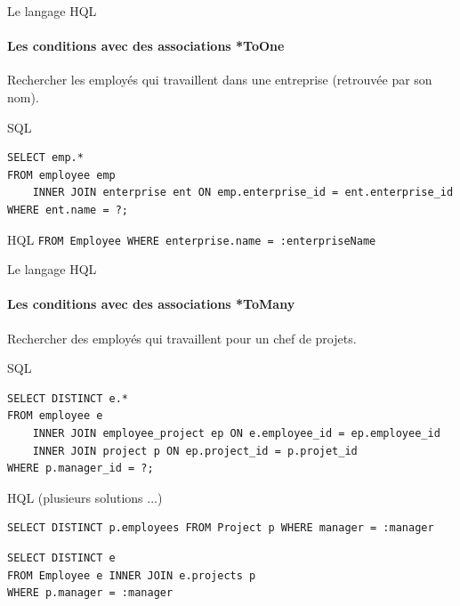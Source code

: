 \documentclass[compact]{beamer}%
\begin{document}
\begin{frame}[fragile]{Le langage HQL}
	\framesubtitle{Les conditions avec des associations *ToOne}
	
	\begin{block}{}
		\center
		Rechercher les employés qui travaillent dans une entreprise (retrouvée par son nom).
	\end{block}
	
	\begin{exampleblock}{SQL}
	\begin{lstlisting}
SELECT emp.*
FROM employee emp
    INNER JOIN enterprise ent ON emp.enterprise_id = ent.enterprise_id
WHERE ent.name = ?;
	\end{lstlisting}
	\end{exampleblock}

	\pause
	\begin{exampleblock}{HQL}
		\texttt{FROM Employee WHERE enterprise.name = :enterpriseName}
	\end{exampleblock}

\end{frame}

\begin{frame}[fragile]{Le langage HQL}
	\framesubtitle{Les conditions avec des associations *ToMany}
	
	\begin{block}{}
		\center
		Rechercher des employés qui travaillent pour un chef de projets.
	\end{block}
	
	\begin{exampleblock}{SQL}
	\begin{lstlisting}
SELECT DISTINCT e.*
FROM employee e
    INNER JOIN employee_project ep ON e.employee_id = ep.employee_id
    INNER JOIN project p ON ep.project_id = p.projet_id
WHERE p.manager_id = ?;
	\end{lstlisting}
	\end{exampleblock}
	
	\pause
	\begin{exampleblock}{HQL (plusieurs solutions ...)}
	\begin{lstlisting}
SELECT DISTINCT p.employees FROM Project p WHERE manager = :manager
	\end{lstlisting}
	\pause
	\begin{lstlisting}
SELECT DISTINCT e
FROM Employee e INNER JOIN e.projects p
WHERE p.manager = :manager
	\end{lstlisting}
	\end{exampleblock}

\end{frame}
\end{document}
